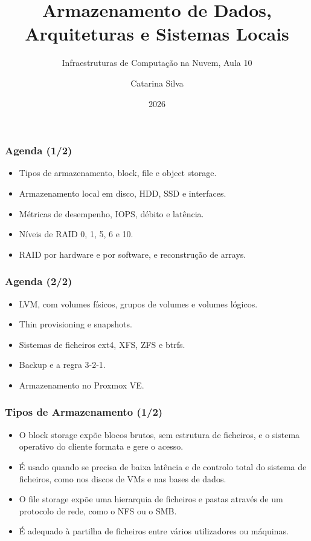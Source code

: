 \documentclass[aspectratio=169]{beamer}
\title{Armazenamento de Dados, Arquiteturas e Sistemas Locais}
\subtitle{Infraestruturas de Computação na Nuvem, Aula 10}
\author{Catarina Silva}
\institute{ESTGA, Universidade de Aveiro}
\date{2026}
\begin{document}
\begin{frame}[plain]
  \titlepage
\end{frame}

\begin{frame}
\frametitle{Agenda \textcolor{NudeTaupe}{\small(1/2)}}
\begin{itemize}
    \setlength\itemsep{0.4cm}
    \item Tipos de armazenamento, block, file e object storage.
    \item Armazenamento local em disco, HDD, SSD e interfaces.
    \item Métricas de desempenho, IOPS, débito e latência.
    \item Níveis de RAID 0, 1, 5, 6 e 10.
    \item RAID por hardware e por software, e reconstrução de arrays.
\end{itemize}
\end{frame}

\begin{frame}
\frametitle{Agenda \textcolor{NudeTaupe}{\small(2/2)}}
\begin{itemize}
    \setlength\itemsep{0.4cm}
    \item LVM, com volumes físicos, grupos de volumes e volumes lógicos.
    \item Thin provisioning e snapshots.
    \item Sistemas de ficheiros ext4, XFS, ZFS e btrfs.
    \item Backup e a regra 3-2-1.
    \item Armazenamento no Proxmox VE.
\end{itemize}
\end{frame}

\begin{frame}
\frametitle{Tipos de Armazenamento \textcolor{NudeTaupe}{\small(1/2)}}
\begin{itemize}
    \setlength\itemsep{0.4cm}
    \item O block storage expõe blocos brutos, sem estrutura de ficheiros, e o sistema operativo do cliente formata e gere o acesso.
    \item É usado quando se precisa de baixa latência e de controlo total do sistema de ficheiros, como nos discos de VMs e nas bases de dados.
    \item O file storage expõe uma hierarquia de ficheiros e pastas através de um protocolo de rede, como o NFS ou o SMB.
    \item É adequado à partilha de ficheiros entre vários utilizadores ou máquinas.
\end{itemize}
\end{frame}
\end{document}
